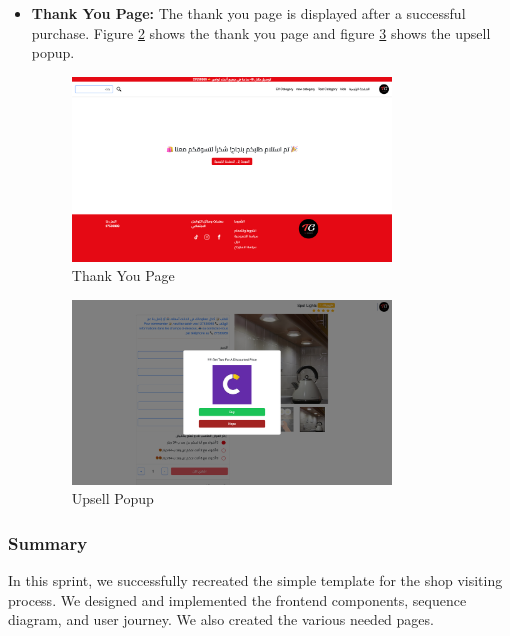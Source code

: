\begin{itemize}
\begin{figure}[H]
        \label{fig:product_detail_page_three}
    \end{figure}
    \item \textbf{Thank You Page:} The thank you page is displayed after a successful purchase. Figure \ref{fig:thank_you_page} shows the thank you page and figure \ref{fig:upsell} shows the upsell popup.
    \begin{figure}[H]
        \centering
        \includegraphics[width=0.8\textwidth]{images/thankYouPage.png}
        \caption{Thank You Page}
        \label{fig:thank_you_page}
    \end{figure}
    \begin{figure}[H]
        \centering
        \includegraphics[width=0.8\textwidth]{images/upsell.png}
        \caption{Upsell Popup}
        \label{fig:upsell}
    \end{figure}
\end{itemize}

\subsubsection{Summary}

In this sprint, we successfully recreated the simple template for the shop visiting process. We designed and implemented the frontend components, sequence diagram, and user journey. We also created the various needed pages.


